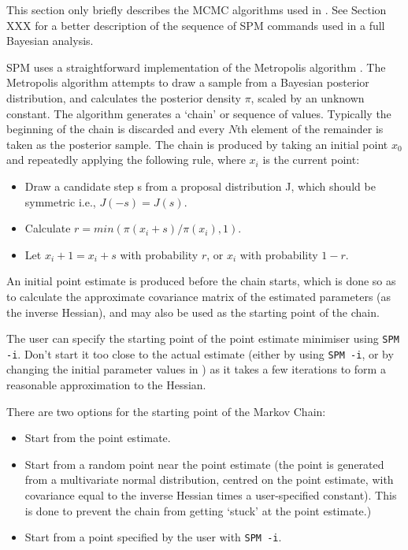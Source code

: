 This section only briefly describes the MCMC algorithms used in \SPM. See Section XXX for a better description of the sequence of SPM commands used in a full Bayesian analysis.

SPM uses a straightforward implementation of the Metropolis algorithm \citep{823,143}. The Metropolis algorithm attempts to draw a sample from a Bayesian posterior distribution, and calculates the posterior density $\pi$, scaled by an unknown constant. The algorithm generates a `chain' or sequence of values. Typically the beginning of the chain is discarded and every $N$th element of the remainder is taken as the posterior sample. The chain is produced by taking an initial point $x_0$ and repeatedly applying the following rule, where $x_i$ is the current point: 

\begin{itemize}
\item Draw a candidate step s from a proposal distribution J, which should be symmetric i.e., $J(-s)=J(s)$.

\item Calculate $r=min(\pi(x_i+s)/\pi(x_i),1)$. 

\item Let $x_i+1=x_i+s$ with probability $r$, or $x_i$ with probability $1-r$.
\end{itemize}

An initial point estimate is produced before the chain starts, which is done so as to calculate the approximate covariance matrix of the estimated parameters (as the inverse Hessian), and may also be used as the starting point of the chain. 

The user can specify the starting point of the point estimate minimiser using \texttt{SPM -i}. Don't start it too close to the actual estimate (either by using \texttt{SPM -i}, or by changing the initial parameter values in \config) as it takes a few iterations to form a reasonable approximation to the Hessian. 

There are two options for the starting point of the Markov Chain: 

\begin{itemize}
\item Start from the point estimate.

\item Start from a random point near the point estimate (the point is generated from a multivariate normal distribution, centred on the point estimate, with covariance equal to the inverse Hessian times a user-specified constant). This is done to prevent the chain from getting `stuck' at the point estimate.)

\item Start from a point specified by the user with \texttt{SPM -i}.
\end{itemize}

